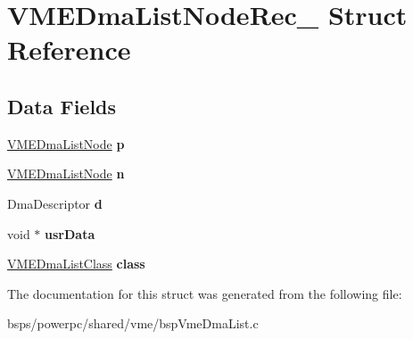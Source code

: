 \hypertarget{structVMEDmaListNodeRec__}{}\section{V\+M\+E\+Dma\+List\+Node\+Rec\+\_\+ Struct Reference}
\label{structVMEDmaListNodeRec__}
\subsection*{Data Fields}
\begin{DoxyCompactItemize}
\item 
\mbox{\label{structVMEDmaListNodeRec___a78a2ebdef6010bf601f8cc24c9ec5854}} 
\mbox{\hyperlink{structVMEDmaListNodeRec__}{V\+M\+E\+Dma\+List\+Node}} {\bfseries p}
\item 
\mbox{\label{structVMEDmaListNodeRec___aeddf50b6cd4735f6dcb292fbe7d36b4a}} 
\mbox{\hyperlink{structVMEDmaListNodeRec__}{V\+M\+E\+Dma\+List\+Node}} {\bfseries n}
\item 
\mbox{\label{structVMEDmaListNodeRec___a5ff2f14714538de8df5e1b33f7461fe8}} 
Dma\+Descriptor {\bfseries d}
\item 
\mbox{\label{structVMEDmaListNodeRec___ad58736f7b8eda862afd2acd8408a22e0}} 
void $\ast$ {\bfseries usr\+Data}
\item 
\mbox{\label{structVMEDmaListNodeRec___a3d6bae532299bc819ef247f2894bfa2c}} 
\mbox{\hyperlink{structVMEDmaListClassRec__}{V\+M\+E\+Dma\+List\+Class}} {\bfseries class}
\end{DoxyCompactItemize}


The documentation for this struct was generated from the following file\+:\begin{DoxyCompactItemize}
\item 
bsps/powerpc/shared/vme/bsp\+Vme\+Dma\+List.\+c\end{DoxyCompactItemize}
